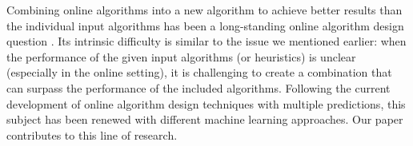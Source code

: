 Combining online algorithms into a new algorithm to achieve better results than the individual input algorithms has been a long-standing online algorithm design question \cite{AzarBroder93:On-line-Choice,BlumBurch00:On-line-Learning}.
Its intrinsic difficulty is similar to the issue we mentioned earlier: when the performance of the given input algorithms (or heuristics) is unclear (especially in the online setting), it is challenging to create a combination that can surpass the performance of the included algorithms.
Following the current development of online algorithm design techniques with multiple predictions, this subject has been renewed with different machine learning approaches. Our paper contributes to this line of research.
